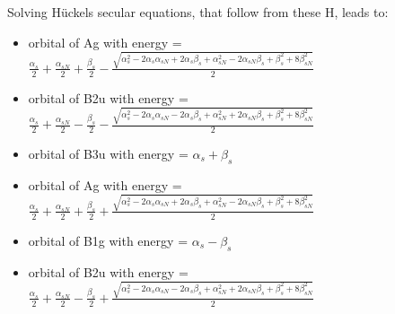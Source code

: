 \documentclass[12pt,a4paper]{article}
\begin{document}
Solving Hückels secular equations, that follow from these H, leads to:
\begin{itemize}
\item orbital of Ag with energy = $\frac{\alpha_{s}}{2} + \frac{\alpha_{s N}}{2} + \frac{\beta_{s}}{2} - \frac{\sqrt{\alpha_{s}^{2} - 2 \alpha_{s} \alpha_{s N} + 2 \alpha_{s} \beta_{s} + \alpha_{s N}^{2} - 2 \alpha_{s N} \beta_{s} + \beta_{s}^{2} + 8 \beta_{s N}^{2}}}{2}$
\item orbital of B2u with energy = $\frac{\alpha_{s}}{2} + \frac{\alpha_{s N}}{2} - \frac{\beta_{s}}{2} - \frac{\sqrt{\alpha_{s}^{2} - 2 \alpha_{s} \alpha_{s N} - 2 \alpha_{s} \beta_{s} + \alpha_{s N}^{2} + 2 \alpha_{s N} \beta_{s} + \beta_{s}^{2} + 8 \beta_{s N}^{2}}}{2}$
\item orbital of B3u with energy = $\alpha_{s} + \beta_{s}$
\item orbital of Ag with energy = $\frac{\alpha_{s}}{2} + \frac{\alpha_{s N}}{2} + \frac{\beta_{s}}{2} + \frac{\sqrt{\alpha_{s}^{2} - 2 \alpha_{s} \alpha_{s N} + 2 \alpha_{s} \beta_{s} + \alpha_{s N}^{2} - 2 \alpha_{s N} \beta_{s} + \beta_{s}^{2} + 8 \beta_{s N}^{2}}}{2}$
\item orbital of B1g with energy = $\alpha_{s} - \beta_{s}$
\item orbital of B2u with energy = $\frac{\alpha_{s}}{2} + \frac{\alpha_{s N}}{2} - \frac{\beta_{s}}{2} + \frac{\sqrt{\alpha_{s}^{2} - 2 \alpha_{s} \alpha_{s N} - 2 \alpha_{s} \beta_{s} + \alpha_{s N}^{2} + 2 \alpha_{s N} \beta_{s} + \beta_{s}^{2} + 8 \beta_{s N}^{2}}}{2}$
\end{itemize}
\end{document}
